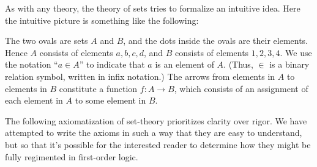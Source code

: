 As with any theory, the theory of sets tries to formalize an intuitive
idea.  Here the intuitive picture is something like the following:
\begin{figure}[h]
 \centering
\end{figure}
The two ovals are sets $A$ and $B$, and the dots inside the ovals are
their elements.  Hence $A$ consists of elements $a,b,c,d$, and $B$
consists of elements $1,2,3,4$.  We use the notation ``$a\in A$'' to
indicate that $a$ is an element of $A$.  (Thus, $\in$ is a binary
relation symbol, written in infix notation.)  The arrows from elements
in $A$ to elements in $B$ constitute a function $f:A\to B$, which
consists of an assignment of each element in $A$ to some element in
$B$.

The following axiomatization of set-theory prioritizes clarity over
rigor.  We have attempted to write the axioms in such a way that they
are easy to understand, but so that it's possible for the interested
reader to determine how they might be fully regimented in first-order
logic.

